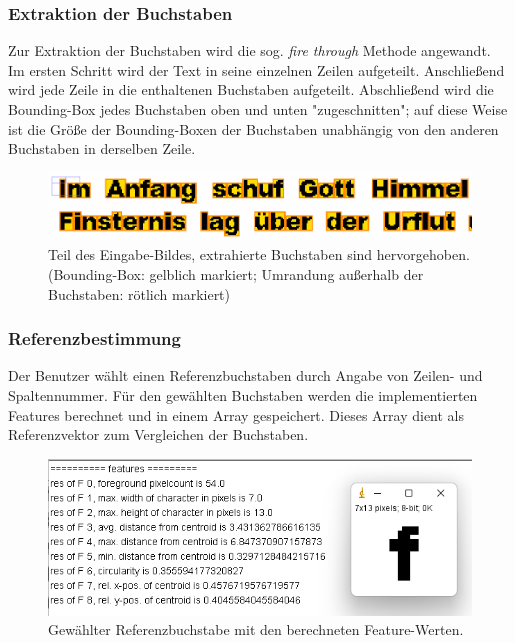 \documentclass[german,notitlepage,smartquotes]{hgbreport}
\begin{document}
\subsubsection{Extraktion der Buchstaben}

Zur Extraktion der Buchstaben wird die sog. \textit{fire through} Methode angewandt. Im ersten Schritt wird der Text in seine einzelnen Zeilen aufgeteilt. Anschließend wird jede Zeile in die enthaltenen Buchstaben aufgeteilt. Abschließend wird die Bounding-Box jedes Buchstaben oben und unten "zugeschnitten"; auf diese Weise ist die Größe der Bounding-Boxen der Buchstaben unabhängig von den anderen Buchstaben in derselben Zeile.

\begin{figure}[h]
\centering
\includegraphics[width=.85\textwidth]{character_detection}
\caption{Teil des Eingabe-Bildes, extrahierte Buchstaben sind hervorgehoben. (Bounding-Box: gelblich markiert; Umrandung außerhalb der Buchstaben: rötlich markiert)}
\label{fig:character_detection}
\end{figure}

\subsubsection{Referenzbestimmung}

Der Benutzer wählt einen Referenzbuchstaben durch Angabe von Zeilen- und Spaltennummer. Für den gewählten Buchstaben werden die implementierten Features berechnet und in einem Array gespeichert. Dieses Array dient als Referenzvektor zum Vergleichen der Buchstaben.

\begin{figure}[h]
\centering
\includegraphics[width=.85\textwidth]{ref_features}
\caption{Gewählter Referenzbuchstabe mit den berechneten Feature-Werten.}
\label{fig:ref_features}
\end{figure}
\end{document}
